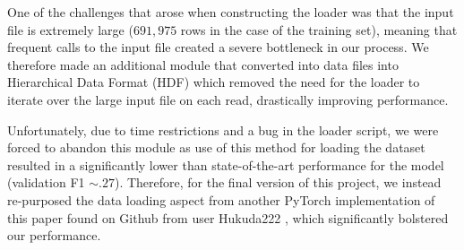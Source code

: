 \documentclass{article} %
\begin{document}
One of the challenges that arose when constructing the loader was that the input file is extremely large ($691,975$ rows in the case of the training set), meaning that frequent calls to the input file created a severe bottleneck in our process. We therefore made an additional module that converted into data files into Hierarchical Data Format (HDF) which removed the need for the loader to iterate over the large input file on each read, drastically improving performance.

Unfortunately, due to time restrictions and a bug in the loader script, we were forced to abandon this module as use of this method for loading the dataset resulted in a significantly lower than state-of-the-art performance for the model (validation F1 $\sim.27$). Therefore, for the final version of this project, we instead re-purposed the data loading aspect from another PyTorch implementation of this paper found on Github from user Hukuda222%
, which significantly bolstered our performance.
\end{document}
